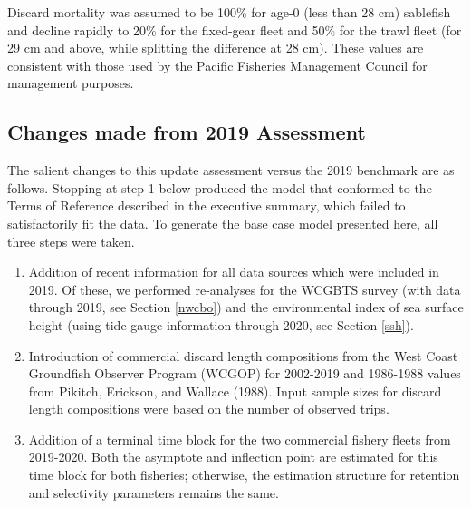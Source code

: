 \documentclass[11pt,
  english,
  a4paper,
]{article}
\begin{document}

Discard mortality was assumed to be 100\% for age-0 (less than 28 cm) sablefish and decline rapidly to 20\% for the fixed-gear fleet and 50\% for the trawl fleet (for 29 cm and above, while splitting the difference at 28 cm). These values are consistent with those used by the Pacific Fisheries Management Council for management purposes.

\leavevmode\tagmcend\tagstructend\par


\hypertarget{changes-made-from-2019-assessment}{%
\subsection{Changes made from 2019 Assessment}\label{changes-made-from-2019-assessment}}

\leavevmode\tagmcend\tagstructend

The salient changes to this update assessment versus the 2019 benchmark are as follows. Stopping at step 1 below produced the model that conformed to the Terms of Reference described in the executive summary, which failed to satisfactorily fit the data. To generate the base case model presented here, all three steps were taken.

\begin{enumerate}
\item Addition of recent information for all data sources which were included in 2019. Of these, we performed re-analyses for the WCGBTS survey (with data through 2019, see Section \ref{nwcbo}) and the environmental index of sea surface height (using tide-gauge information through 2020, see Section \ref{ssh}). 
\item Introduction of commercial discard length compositions from the West Coast Groundfish Observer Program (WCGOP) for 2002-2019 and 1986-1988 values from Pikitch, Erickson, and Wallace (1988). Input sample sizes for discard length compositions were based on the number of observed trips. 
\item Addition of a terminal time block for the two commercial fishery fleets from 2019-2020. Both the asymptote and inflection point are estimated for this time block for both fisheries; otherwise, the estimation structure for retention and selectivity parameters remains the same.
\end{enumerate}
\end{document}
